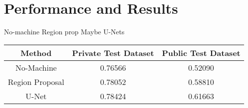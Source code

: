 \chapter{Performance and Results}
No-machine
Region prop
Maybe U-Nets

\begin{table}
	\centering
	\begin{tabular}{|c|c|c|}
		\hline
		Method & Private Test Dataset & Public Test Dataset \\ \hline
		No-Machine & 0.76566	& 0.52090  \\ \hline
		Region Proposal & 0.78052	& 0.58810 \\ \hline
		U-Net & 0.78424	& 0.61663  \\ \hline
	\end{tabular}
	\label{resultOnComp}
\end{table}